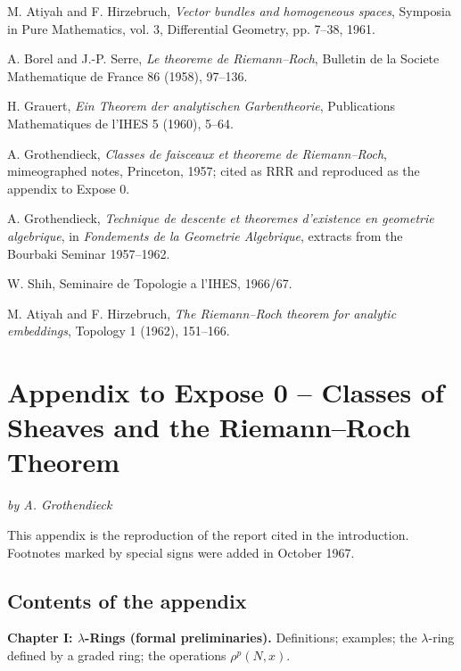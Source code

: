 \documentclass[11pt]{article}
\theoremstyle{plain}
\theoremstyle{definition}
\theoremstyle{remark}
\begin{document}
\begin{enumerate}[label={\,[\arabic*]\,},leftmargin=*]
\item M. Atiyah and F. Hirzebruch, \emph{Vector bundles and homogeneous spaces}, Symposia in Pure Mathematics, vol. 3, Differential Geometry, pp. 7--38, 1961.
\item A. Borel and J.-P. Serre, \emph{Le theoreme de Riemann--Roch}, Bulletin de la Societe Mathematique de France 86 (1958), 97--136.
\item H. Grauert, \emph{Ein Theorem der analytischen Garbentheorie}, Publications Mathematiques de l'IHES 5 (1960), 5--64.
\item A. Grothendieck, \emph{Classes de faisceaux et theoreme de Riemann--Roch}, mimeographed notes, Princeton, 1957; cited as RRR and reproduced as the appendix to Expose 0.
\item A. Grothendieck, \emph{Technique de descente et theoremes d'existence en geometrie algebrique}, in \emph{Fondements de la Geometrie Algebrique}, extracts from the Bourbaki Seminar 1957--1962.
\item W. Shih, Seminaire de Topologie a l'IHES, 1966/67.
\item M. Atiyah and F. Hirzebruch, \emph{The Riemann--Roch theorem for analytic embeddings}, Topology 1 (1962), 151--166.
\end{enumerate}

\newpage

\section{Appendix to Expose 0 -- Classes of Sheaves and the Riemann--Roch Theorem}

\begin{center}
\emph{by A. Grothendieck}
\end{center}

This appendix is the reproduction of the report cited in the introduction. Footnotes marked by special signs were added in October 1967.

\subsection*{Contents of the appendix}

\textbf{Chapter I: $\lambda$-Rings (formal preliminaries).} Definitions; examples; the $\lambda$-ring defined by a graded ring; the operations $\rho^p(N,x)$.
\end{document}
